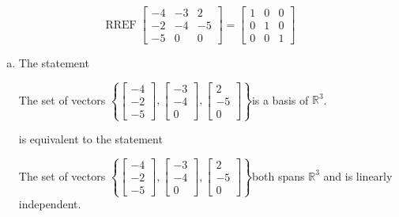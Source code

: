 \begin{exerciseAnswer} 


\[\operatorname{RREF} \left[\begin{array}{ccc}
-4 & -3 & 2 \\
-2 & -4 & -5 \\
-5 & 0 & 0
\end{array}\right] = \left[\begin{array}{ccc}
1 & 0 & 0 \\
0 & 1 & 0 \\
0 & 0 & 1
\end{array}\right] \]


\begin{enumerate}[(a)]
\item The statement 
\begin{center}\begin{minipage}{0.8\textwidth}
 The set of vectors \( \left\{ \left[\begin{array}{c}
-4 \\
-2 \\
-5
\end{array}\right] , \left[\begin{array}{c}
-3 \\
-4 \\
0
\end{array}\right] , \left[\begin{array}{c}
2 \\
-5 \\
0
\end{array}\right] \right\} \)is a basis of \(\mathbb{R}^3\). 
\end{minipage}\end{center}
     is equivalent to the statement 
\begin{center}\begin{minipage}{0.8\textwidth}
 The set of vectors \( \left\{ \left[\begin{array}{c}
-4 \\
-2 \\
-5
\end{array}\right] , \left[\begin{array}{c}
-3 \\
-4 \\
0
\end{array}\right] , \left[\begin{array}{c}
2 \\
-5 \\
0
\end{array}\right] \right\} \)both spans \(\mathbb{R}^3\) and is linearly independent.
\end{minipage}\end{center}
    

\end{enumerate}
\end{exerciseAnswer}
